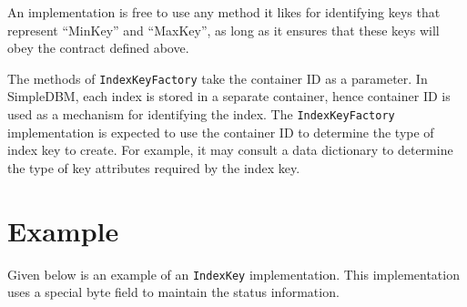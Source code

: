 \documentclass[a4paper,draft,oneside]{book}
\begin{document}
An implementation is free to use any method it likes for 
identifying keys that represent ``MinKey'' and ``MaxKey'', as long as it ensures
that these keys will obey the contract defined above.

The methods of \verb|IndexKeyFactory| take the container ID as
a parameter. In SimpleDBM, each index is stored in a separate container,
hence container ID is used as a mechanism for identifying the index.
The \verb|IndexKeyFactory| implementation is expected to use the
container ID to determine the type of index key to create. For example, it may
consult a data dictionary to determine the type of key attributes required
by the index key.

\section{Example}

Given below is an example of an \verb|IndexKey| implementation. This 
implementation uses a special byte field to maintain the status information.
\end{document}
